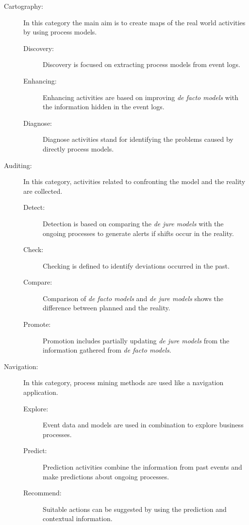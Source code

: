 \begin{description}
\item[Cartography:] In this category the main aim is to create maps of the real world activities by using process models. 
	\begin{description}
	\item[Discovery:] Discovery is focused on extracting process models from event logs. 
	\item[Enhancing:] Enhancing activities are based on improving \textit{de facto models} with the information hidden in the event logs. 
	\item[Diagnose:] Diagnose activities stand for identifying the problems caused by directly process models.
	\end{description}

\item[Auditing:] In this category, activities related to confronting the model and the reality are collected.
	\begin{description}
	\item[Detect:] Detection is based on comparing the \textit{de jure models} with the ongoing processes to generate alerts if shifts occur in the reality.
	\item[Check:] Checking is defined to identify deviations occurred in the past.
	\item[Compare:] Comparison of \textit{de facto models} and \textit{de jure models} shows the difference between planned and the reality.
	\item[Promote:] Promotion includes  partially updating \textit{de jure models} from the information gathered from \textit{de facto models}.
	\end{description}

\item[Navigation:] In this category, process mining methods are used like a navigation application.
	\begin{description}
	\item[Explore:] Event data and models are used in combination to explore business processes.
	\item[Predict:] Prediction activities combine the information from past events and make predictions about ongoing processes.
	\item[Recommend:] Suitable actions can be suggested by using the prediction and contextual  information.
	\end{description}
\end{description}

